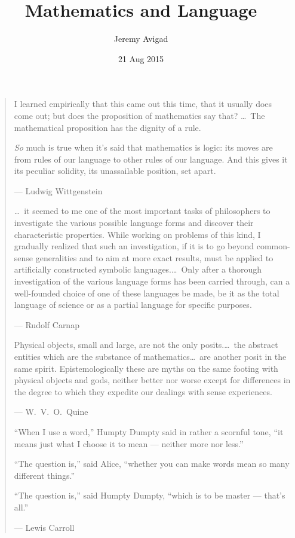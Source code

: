 \documentclass[12pt]{article}
\title{Mathematics and Language}
\author{Jeremy Avigad}
\date{21 Aug 2015}
\begin{document}
\maketitle

\begin{quote}

I learned empirically that this came out this time, that it usually does come out; but does the proposition of mathematics say that? \ldots\ The mathematical proposition has the dignity of a rule.

\emph{So} much is true when it's said that mathematics is logic: its moves are from rules of our language to other rules of our language. And this gives it its peculiar solidity, its unassailable position, set apart.

--- Ludwig Wittgenstein

\bigskip

\ldots\ it seemed to me one of the most important tasks of philosophers to investigate the various possible language forms and discover their characteristic properties. While working on problems of this kind, I gradually realized that such an investigation, if it is to go beyond common-sense generalities and to aim at more exact results, must be applied to artificially constructed symbolic languages.\ldots\ Only after a thorough investigation of the various language forms has been carried through, can a well-founded choice of one of these languages be made, be it as the total language of science or as a partial language for specific purposes.

--- Rudolf Carnap

\bigskip

Physical objects, small and large, are not the only posits.\ldots\ the abstract entities which are the substance of mathematics\ldots\ are another posit in the same spirit. Epistemologically these are myths on the same footing with physical objects and gods, neither better nor worse except for differences in the degree to which they expedite our dealings with sense experiences.

--- W.~V.~O.~Quine

\bigskip

``When I use a word,'' Humpty Dumpty said in rather a scornful tone, ``it means just what I choose it to mean --- neither more nor less.''

``The question is,'' said Alice, ``whether you can make words mean so many different things.''

``The question is,'' said Humpty Dumpty, ``which is to be master --- that's all.''

--- Lewis Carroll

\end{quote}
\end{document}
